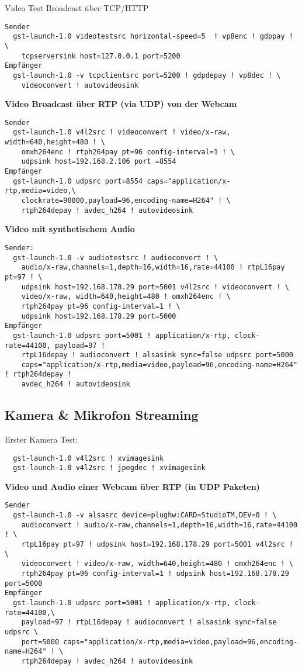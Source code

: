 Video Test Broadcast über TCP/HTTP
\begin{verbatim}
Sender
  gst-launch-1.0 videotestsrc horizontal-speed=5  ! vp8enc ! gdppay ! \
    tcpserversink host=127.0.0.1 port=5200
Empfänger
  gst-launch-1.0 -v tcpclientsrc port=5200 ! gdpdepay ! vp8dec ! \
    videoconvert ! autovideosink
\end{verbatim}

\textbf{Video Broadcast über RTP (via UDP) von der Webcam}
\begin{verbatim}
Sender
  gst-launch-1.0 v4l2src ! videoconvert ! video/x-raw, width=640,height=480 ! \
    omxh264enc ! rtph264pay pt=96 config-interval=1 ! \
    udpsink host=192.168.2.106 port =8554
Empfänger
  gst-launch-1.0 udpsrc port=8554 caps="application/x-rtp,media=video,\
    clockrate=90000,payload=96,encoding-name=H264" ! \
    rtph264depay ! avdec_h264 ! autovideosink
\end{verbatim}

\textbf{Video mit synthetischem Audio}
\begin{verbatim}
Sender:
  gst-launch-1.0 -v audiotestsrc ! audioconvert ! \
    audio/x-raw,channels=1,depth=16,width=16,rate=44100 ! rtpL16pay pt=97 ! \
    udpsink host=192.168.178.29 port=5001 v4l2src ! videoconvert ! \
    video/x-raw, width=640,height=480 ! omxh264enc ! \
    rtph264pay pt=96 config-interval=1 ! \
    udpsink host=192.168.178.29 port=5000
Empfänger
  gst-launch-1.0 udpsrc port=5001 ! application/x-rtp, clock-rate=44100, payload=97 ! 
    rtpL16depay ! audioconvert ! alsasink sync=false udpsrc port=5000 
    caps="application/x-rtp,media=video,payload=96,encoding-name=H264" ! rtph264depay !     
    avdec_h264 ! autovideosink
\end{verbatim}

\subsection{Kamera \& Mikrofon Streaming}
Erster Kamera Test:
\begin{verbatim}
  gst-launch-1.0 v4l2src ! xvimagesink
  gst-launch-1.0 v4l2src ! jpegdec ! xvimagesink
\end{verbatim}

\textbf{Video und Audio einer Webcam über RTP (in UDP Paketen)}
\begin{verbatim}
Sender
  gst-launch-1.0 -v alsasrc device=plughw:CARD=StudioTM,DEV=0 ! \
    audioconvert ! audio/x-raw,channels=1,depth=16,width=16,rate=44100 ! \
    rtpL16pay pt=97 ! udpsink host=192.168.178.29 port=5001 v4l2src ! \
    videoconvert ! video/x-raw, width=640,height=480 ! omxh264enc ! \
    rtph264pay pt=96 config-interval=1 ! udpsink host=192.168.178.29 port=5000
Empfänger
  gst-launch-1.0 udpsrc port=5001 ! application/x-rtp, clock-rate=44100,\
    payload=97 ! rtpL16depay ! audioconvert ! alsasink sync=false udpsrc \
    port=5000 caps="application/x-rtp,media=video,payload=96,encoding-name=H264" ! \
    rtph264depay ! avdec_h264 ! autovideosink
\end{verbatim}

